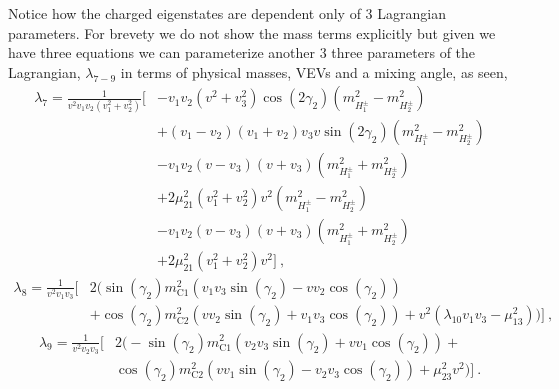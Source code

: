 Notice how the charged eigenstates are dependent only of 3 Lagrangian parameters. For brevety we do not show the mass terms explicitly but given we have three equations we can parameterize another 3 three parameters of the Lagrangian, $\lambda_{7-9}$ in terms of physical masses, VEVs and a mixing angle, as seen, 
\begin{equation}
\begin{split}
\lambda_7 = \frac{1}{v^2 v_1 v_2
   \left(v_1^2+v_2^2\right)} \Bigg[ & -v_1 v_2 \left(v^2+v_3^2\right) \cos \left(2 \gamma _2\right) \left( m_{H^\pm_1}^2 - m_{H^\pm_2}^2 \right) \\ & + \left(v_1-v_2\right) \left(v_1+v_2\right) v_3 v \sin \left(2 \gamma _2\right)
   \left( m_{H^\pm_1}^2  - m_{H^\pm_2}^2 \right) \\ & -v_1 v_2 \left(v-v_3\right) \left(v+v_3\right) \left( m_{H^\pm_1}^2 + m_{H^\pm_2}^2 \right)  \\ & +2 \mu_{21}^2 \left(v_1^2+v_2^2\right) v^2 
   \left( m_{H^\pm_1}^2 - m_{H^\pm_2}^2 \right)  \\ & -v_1 v_2 \left(v-v_3\right) \left(v+v_3\right)  \left( m_{H^\pm_1}^2 + m_{H^\pm_2}^2 \right) \\ & +2 \mu_{21}^2 \left(v_1^2+v_2^2\right) v^2 \Bigg] \ , 
\end{split}
\end{equation}
%
\begin{equation}
\begin{split}
\lambda_8  = \frac{1}{v^2 v_1 v_3} \Bigg[ & 2 \Bigg(\sin \left(\gamma _2\right) m_{\text{C1}}^2 \left(v_1 v_3 \sin \left(\gamma _2\right)-v v_2 \cos \left(\gamma _2\right)\right) \\ & +\cos \left(\gamma _2\right) m_{\text{C2}}^2 \left(v v_2 \sin\left(\gamma _2\right)+v_1 v_3 \cos \left(\gamma _2\right)\right)+v^2 \left(\lambda _{10} v_1 v_3- \mu_{13}^2\right)\Bigg) \Bigg] \ , 
\end{split}
\end{equation}
%
\begin{equation}
\begin{split}
\lambda_9 = \frac{1}{v^2 v_2 v_3} \Bigg[ & 2 \Bigg(-\sin \left(\gamma _2\right) m_{\text{C1}}^2 \left(v_2 v_3 \sin \left(\gamma _2\right)+v v_1 \cos \left(\gamma _2\right)\right)+ \\ & \cos \left(\gamma _2\right) m_{\text{C2}}^2 \left(v v_1 \sin \left(\gamma _2\right)-v_2 v_3 \cos \left(\gamma _2\right)\right)+\mu_{23}^2 v^2\Bigg) \Bigg] \ .
\end{split}
\end{equation} 

